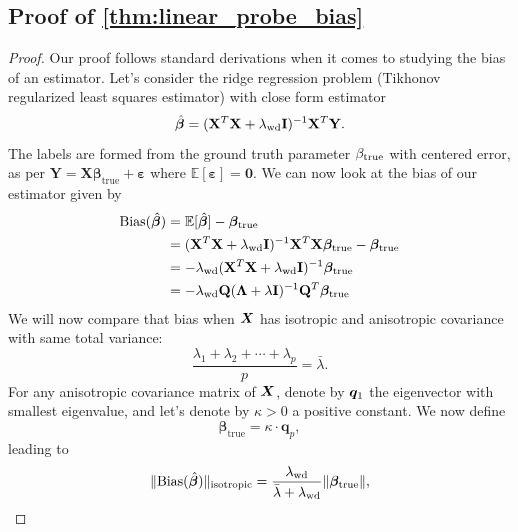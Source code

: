 \subsection{Proof of \cref{thm:linear_probe_bias}}
\label{proof:linear_probe_bias}


\begin{proof}
Our proof follows standard derivations when it comes to studying the bias of an estimator. Let's consider the ridge regression problem (Tikhonov regularized least squares estimator) with close form estimator
\begin{equation}
\hat{\boldsymbol{\beta}} = (\mathbf{X}^T \mathbf{X} + \lambda_{\rm wd} \mathbf{I})^{-1} \mathbf{X}^T \mathbf{Y}.
\end{equation}
The labels are formed from the ground truth parameter $\beta_{\rm true}$ with centered error, as per $\mathbf{Y} = \mathbf{X}\boldsymbol{\beta}_{\text{true}} + \boldsymbol{\varepsilon}$ where $\mathbb{E}[\boldsymbol{\varepsilon}] = \mathbf{0}$.
We can now look at the bias of our estimator given by
\begin{align*}
\text{Bias}(\hat{\boldsymbol{\beta}}) &= \mathbb{E}[\hat{\boldsymbol{\beta}}] - \boldsymbol{\beta}_{\text{true}} \\
&=(\mathbf{X}^T \mathbf{X} + \lambda_{\rm wd} \mathbf{I})^{-1} \mathbf{X}^T \mathbf{X}\boldsymbol{\beta}_{\text{true}}-\boldsymbol{\beta}_{\text{true}}\\
&= -\lambda_{\rm wd}(\mathbf{X}^T \mathbf{X} + \lambda_{\rm wd} \mathbf{I})^{-1} \boldsymbol{\beta}_{\text{true}}\\
&= -\lambda_{\rm wd} \mathbf{Q}(\boldsymbol{\Lambda} + \lambda \mathbf{I})^{-1}\mathbf{Q}^T \boldsymbol{\beta}_{\text{true}}
\end{align*}
We will now compare that bias when ${\bm{X}}$ has isotropic and anisotropic covariance with same total variance:
\begin{equation}
\frac{\lambda_1 + \lambda_2 + \cdots + \lambda_p}{p} = \bar{\lambda}.
\end{equation}
For any anisotropic covariance matrix of ${\bm{X}}$, denote by ${\bm{q}}_1$ the eigenvector with smallest eigenvalue, and let's denote by $\kappa>0$ a positive constant. We now define
\begin{equation}
\boldsymbol{\beta}_{\text{true}} = \kappa \cdot \mathbf{q}_p,
\end{equation}
leading to
\begin{align*}
\|\text{Bias}(\hat{\boldsymbol{\beta}})\|_{\text{isotropic}} = \frac{\lambda_{\rm wd}}{\bar{\lambda} + \lambda_{\rm wd}} \|\boldsymbol{\beta}_{\text{true}}\|,\\

\end{align*}
\end{proof}

